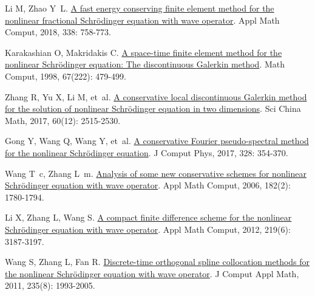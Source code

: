 \begin{thebibliography}{79}
    Li M, Zhao Y~L.
    \newblock \href{https://linkinghub.elsevier.com/retrieve/pii/S0096300318304983}{A fast energy conserving finite element method for the nonlinear fractional {{Schr{\"o}dinger}} equation with wave operator}\allowbreak[J].
    \newblock Appl Math Comput, 2018, 338: 758-773.
    
    Karakashian O, Makridakis C.
    \newblock \href{https://www.ams.org/mcom/1998-67-222/S0025-5718-98-00946-6/}{A space-time finite element method for the nonlinear {{Schr{\"o}dinger}} equation: The discontinuous {{Galerkin}} method}\allowbreak[J].
    \newblock Math Comput, 1998, 67\allowbreak (222): 479-499.
    
    Zhang R, Yu X, Li M, et~al.
    \newblock \href{https://doi.org/10.1007/s11425-016-9118-x}{A conservative local discontinuous {{Galerkin}} method for the solution of nonlinear {{Schr{\"o}dinger}} equation in two dimensions}\allowbreak[J].
    \newblock Sci China Math, 2017, 60\allowbreak (12): 2515-2530.
    
    Gong Y, Wang Q, Wang Y, et~al.
    \newblock \href{https://www.sciencedirect.com/science/article/pii/S0021999116305204}{A conservative {{Fourier}} pseudo-spectral method for the nonlinear {{Schr{\"o}dinger}} equation}\allowbreak[J].
    \newblock J Comput Phys, 2017, 328: 354-370.
    
    Wang T~c, Zhang L~m.
    \newblock \href{https://linkinghub.elsevier.com/retrieve/pii/S009630030600525X}{Analysis of some new conservative schemes for nonlinear {{Schr{\"o}dinger}} equation with wave operator}\allowbreak[J].
    \newblock Appl Math Comput, 2006, 182\allowbreak (2): 1780-1794.
    
    Li X, Zhang L, Wang S.
    \newblock \href{https://linkinghub.elsevier.com/retrieve/pii/S0096300312009502}{A compact finite difference scheme for the nonlinear {{Schr{\"o}dinger}} equation with wave operator}\allowbreak[J].
    \newblock Appl Math Comput, 2012, 219\allowbreak (6): 3187-3197.
    
    Wang S, Zhang L, Fan R.
    \newblock \href{https://linkinghub.elsevier.com/retrieve/pii/S0377042710005510}{Discrete-time orthogonal spline collocation methods for the nonlinear {{Schr{\"o}dinger}} equation with wave operator}\allowbreak[J].
    \newblock J Comput Appl Math, 2011, 235\allowbreak (8): 1993-2005.
    

\end{thebibliography}
